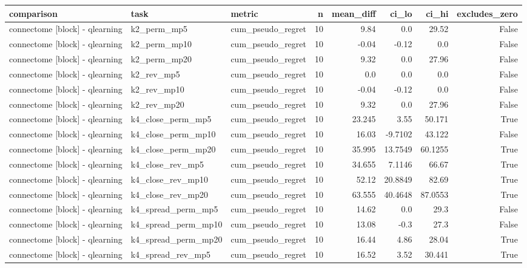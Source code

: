 \begin{table}[t]
\centering
\small
\begin{tabular}{lllrrrrr}
\toprule
comparison & task & metric & n & mean\_diff & ci\_lo & ci\_hi & excludes\_zero \\
\midrule
connectome [block] - qlearning & k2\_perm\_mp5 & cum\_pseudo\_regret & 10 & 9.84 & 0.0 & 29.52 & False \\
connectome [block] - qlearning & k2\_perm\_mp10 & cum\_pseudo\_regret & 10 & -0.04 & -0.12 & 0.0 & False \\
connectome [block] - qlearning & k2\_perm\_mp20 & cum\_pseudo\_regret & 10 & 9.32 & 0.0 & 27.96 & False \\
connectome [block] - qlearning & k2\_rev\_mp5 & cum\_pseudo\_regret & 10 & 0.0 & 0.0 & 0.0 & False \\
connectome [block] - qlearning & k2\_rev\_mp10 & cum\_pseudo\_regret & 10 & -0.04 & -0.12 & 0.0 & False \\
connectome [block] - qlearning & k2\_rev\_mp20 & cum\_pseudo\_regret & 10 & 9.32 & 0.0 & 27.96 & False \\
connectome [block] - qlearning & k4\_close\_perm\_mp5 & cum\_pseudo\_regret & 10 & 23.245 & 3.55 & 50.171 & True \\
connectome [block] - qlearning & k4\_close\_perm\_mp10 & cum\_pseudo\_regret & 10 & 16.03 & -9.7102 & 43.122 & False \\
connectome [block] - qlearning & k4\_close\_perm\_mp20 & cum\_pseudo\_regret & 10 & 35.995 & 13.7549 & 60.1255 & True \\
connectome [block] - qlearning & k4\_close\_rev\_mp5 & cum\_pseudo\_regret & 10 & 34.655 & 7.1146 & 66.67 & True \\
connectome [block] - qlearning & k4\_close\_rev\_mp10 & cum\_pseudo\_regret & 10 & 52.12 & 20.8849 & 82.69 & True \\
connectome [block] - qlearning & k4\_close\_rev\_mp20 & cum\_pseudo\_regret & 10 & 63.555 & 40.4648 & 87.0553 & True \\
connectome [block] - qlearning & k4\_spread\_perm\_mp5 & cum\_pseudo\_regret & 10 & 14.62 & 0.0 & 29.3 & False \\
connectome [block] - qlearning & k4\_spread\_perm\_mp10 & cum\_pseudo\_regret & 10 & 13.08 & -0.3 & 27.3 & False \\
connectome [block] - qlearning & k4\_spread\_perm\_mp20 & cum\_pseudo\_regret & 10 & 16.44 & 4.86 & 28.04 & True \\
connectome [block] - qlearning & k4\_spread\_rev\_mp5 & cum\_pseudo\_regret & 10 & 16.52 & 3.52 & 30.441 & True \\

\end{tabular}
\end{table}
